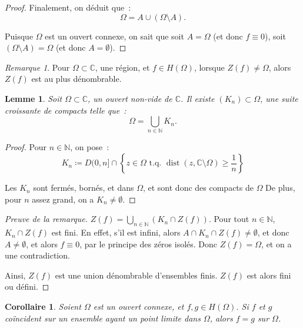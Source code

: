 \documentclass{report}
\newtheorem{cor}[thm]{Corollaire}
\newtheorem{lem}[thm]{Lemme}
\theoremstyle{definition}
\theoremstyle{remark}
\newtheorem*{rmq}{Remarque}
\numberwithin{equation}{section}
\newcommand{\C}{\mathbb C}
\newcommand{\N}{\mathbb N}
\newcommand{\tq}{\text{ t.q. }}
\DeclareMathOperator{\dist}{dist}
\begin{document}
\begin{proof}
			Finalement, on déduit que~:
			\begin{equation}
				\Omega = A \cup (\Omega \setminus A).
			\end{equation}

			Puisque $\Omega$ est un ouvert connexe, on sait que soit $A = \Omega$ (et donc $f \equiv 0$), soit $(\Omega \setminus A) = \Omega$ (et donc $A = \emptyset$).
			\end{proof}

			\begin{rmq} Pour $\Omega \subset \C$, une région, et $f \in H(\Omega)$, lorsque $Z(f) \neq \Omega$, alors $Z(f)$ est au plus dénombrable.
			\end{rmq}

			\begin{lem} Soit $\Omega \subset \C$, un ouvert non-vide de $\C$. Il existe $(K_n) \subset \Omega$, une suite croissante de compacts telle que~:
			\begin{equation}
				\Omega = \bigcup_{n \in \N}K_n.
			\end{equation}
			\end{lem}

			\begin{proof} Pour $n \in \N$, on pose~:
			\begin{equation}
				K_n \coloneqq D(0, n] \cap \left\{z \in \Omega \tq \dist(z, \C \setminus \Omega) \geq \frac 1n\right\}
			\end{equation}

			Les $K_n$ sont fermés, bornés, et dans $\Omega$, et sont donc des compacts de $\Omega$ De plus, pour $n$ assez grand, on a $K_n \neq \emptyset$.
			\end{proof}

			\begin{proof}[Preuve de la remarque] $Z(f) = \bigcup_{n \in \N}\left(K_n \cap Z(f)\right)$. Pour tout $n \in \N$, $K_n \cap Z(f)$ est fini. En effet,
			s'il est infini, alors $A \cap K_n \cap Z(f) \neq \emptyset$, et donc $A \neq \emptyset$, et alors $f \equiv 0$, par le principe des zéros isolés.
			Donc $Z(f) = \Omega$, et on a une contradiction.

			Ainsi, $Z(f)$ est une union dénombrable d'ensembles finis. $Z(f)$ est alors fini ou défini.
			\end{proof}

			\begin{cor} Soient $\Omega$ est un ouvert connexe, et $f, g \in H(\Omega)$. Si $f$ et $g$ coïncident sur un ensemble ayant un point limite dans $\Omega$,
			alors $f = g$ sur $\Omega$.
			\end{cor}
\end{document}
